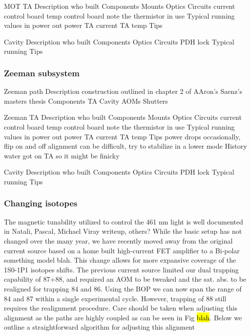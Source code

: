 	MOT TA
		Description
			who built
		Components
			Mounts
			Optics
			Circuits
				current control board
				temp control board
					note the thermistor in use
		Typical running values
			in power
			out power
			TA current
			TA temp
		Tips
		
	Cavity
		Description
			who built
		Components
			Optics
			Circuits
				PDH lock
		Typical running
		Tips

\subsubsection{Zeeman subsystem}

Zeeman path
	Description
		construction outlined in chapter 2 of AAron's Saenz's masters thesis
	Components
		TA
		Cavity
		AOMs
		Shutters
	
	Zeeman TA
		Description
			who built
		Components
			Mounts
			Optics
			Circuits
				current control board
				temp control board
					note the thermistor in use
		Typical running values
			in power
			out power
			TA current
			TA temp
		Tips
			power drops occasionally, flip on and off
			alignment can be difficult, try to stabilize in a lower mode
		History
			water got on TA so it might be finicky
		
	Cavity
		Description
			who built
		Components
			Optics
			Circuits
				PDH lock
		Typical running
		Tips
	
	

\subsubsection{Changing isotopes} \label{sssec:change_iso}

The magnetic tunability utilized to control the 461 nm light is well documented in Natali, Pascal, Michael Viray  writeup, others? While the basic setup has not changed over the many year, we have recently moved away from the original current source based on a home built high-current FET amplifier to a Bi-polar something model blah. This change allows for more expansive coverage of the 1S0-1P1 isotopes shifts. The previous current source limited our dual trapping capability of 87+88, and required an AOM to be tweaked and the sat. abs. to be realigned for trapping 84 and 86. Using the BOP we can now span the range of 84 and 87 within a single experimental cycle. However, trapping of 88 still requires the realignment procedure. Care should be taken when adjusting this alignment as the paths are highly coupled as can be seen in Fig \hl{blah}. Below we outline a straightforward algorithm for adjusting this alignment

